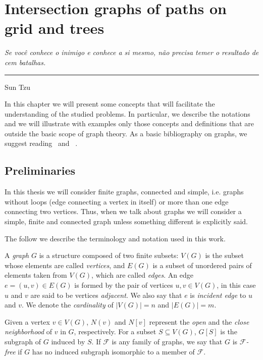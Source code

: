 \chapter{Intersection graphs of paths on grid and trees}\label{Notions}


\begin{flushright}
\begin{minipage}[t][0cm][b]{0.47\textwidth}
\emph{Se você conhece o inimigo e conhece a si mesmo, não precisa temer o resultado de cem batalhas. }
\end{minipage}

\rule[0cm]{7cm}{0.03cm}%

Sun Tzu
\end{flushright}

In this chapter we will present some concepts that will facilitate the understanding of the studied problems. In particular, we describe the notations and we will illustrate with examples only those concepts and definitions that are outside the basic scope of graph theory. As a basic bibliography on graphs, we suggest reading~\cite{bondy1976graph} and~\cite{jayme2018} .

\section{Preliminaries}

In this thesis we will consider finite graphs, connected and simple, i.e. graphs without loops (edge connecting a vertex in itself) or more than one edge connecting two vertices. Thus, when we talk about graphs we will consider a simple, finite and connected graph unless something different is explicitly said.



The follow we describe the terminology and notation used in this work.

A \emph{graph} $ G $ is a structure composed of two finite subsets: $ V(G) $ is the subset whose elements are called \emph{vertices}, and $ E(G) $ is a subset of unordered pairs of elements taken from $ V(G) $, which are called \emph{edges}. An edge $ e=(u, v) \in E (G) $ is formed by the pair of vertices $ u, v \in V(G) $, in this case $ u $ and $ v $ are said to be vertices \emph{adjacent}. We also say that $ e $ is \emph{incident edge} to $ u $ and $ v $. We denote the \emph{cardinality} of $ |V(G)| = n $ and $ |E(G)| = m $.

Given a vertex $v\in V(G)$,  $N(v)$ and $N[v]$ represent the \emph{open} and the  \emph{close neighborhood} of $v$ in $G$, respectively. 
For a subset $S \subseteq V(G)$,  $G[S]$ is the subgraph of $G$ induced by $S$.
 If $\mathcal{F}$ is any family of graphs, we say that  $G$ is  \emph{$\mathcal{F}$-free} if $G$ has no induced subgraph isomorphic to a member of $\mathcal{F}$.


